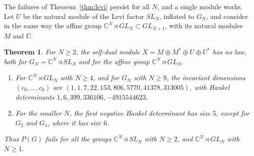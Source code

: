 \documentclass[11pt,reqno]{amsart}
\newtheorem{theorem}{Theorem}[section]
\theoremstyle{definition}
\newcommand{\CC}{\mathbb C}
\begin{document}
The failures of Theorem~\ref{thm:levi} persist for all $N$, and a single module works. Let $U$ be the natural module of the Levi factor $SL_N$, inflated to $G_N$, and consider in the same way the affine group $\CC^N\rtimes GL_N\subset GL_{N+1}$, with its natural modules $M$ and $U$.

\begin{theorem}\label{thm:vector-uniform}
For $N\geq2$, the self-dual module $X=M\oplus M^*\oplus U\oplus U^*$ has no law, both for $G_N=\CC^N\rtimes SL_N$ and for the affine group $\CC^N\rtimes GL_N$. \begin{enumerate}
\item For $\CC^N\rtimes GL_N$ with $N\geq4$, and for $G_N$ with $N\geq9$, the invariant dimensions $(c_0,\ldots,c_8)$ are $(1,1,7,22,153,806,5770,41378,313005)$, with Hankel determinants $1,6,399,336106,-4915544623$.
\item For the smaller $N$, the first negative Hankel determinant has size $5$, except for $G_2$ and $G_4$, where it has size $6$.
\end{enumerate}
Thus $P(G)$ fails for all the groups $\CC^N\rtimes SL_N$ with $N\geq2$, and $\CC^N\rtimes GL_N$ with $N\geq1$.
\end{theorem}
\end{document}
